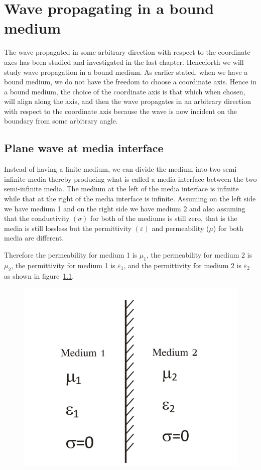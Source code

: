 \chapter{Wave propagating in a bound medium}\label{lec:lec30}
The wave propagated in some arbitrary direction with respect to the coordinate axes has been studied and investigated in the last chapter. Henceforth we will study wave propagation in a bound medium. As earlier stated, when we have a bound medium, we do not have the freedom to choose a coordinate axis. Hence in a bound medium, the choice of the coordinate axis is that which when chosen, will align along the axis, and then the wave propagates in an arbitrary direction with respect to the coordinate axis because the wave is now incident on the boundary from some arbitrary angle.

\section{Plane wave at media interface}

Instead of having a finite medium, we can divide the medium into two semi-infinite media thereby producing what is called a media interface between the two semi-infinite media. The medium at the left of the media interface is infinite while that at the right of the media interface is infinite. Assuming on the left side we have medium 1 and on the right side we have medium 2 and also assuming that the conductivity $(\sigma)$ for both of the mediums is still zero, that is the media is still lossless but the permittivity $(\varepsilon)$ and permeability ($\mu$) for both media are different.

Therefore the permeability for medium 1 is $\mu_1$, the permeability for medium 2 is $\mu_2$, the permittivity for medium 1 is $\varepsilon_1$, and the permittivity for medium 2 is $\varepsilon_2$ as shown in figure~\ref{fig:group30a}.

\begin{figure}[h]
\centering
\includegraphics[width=.7\linewidth]{./graphics/group30a}
\caption{}
\label{fig:group30a}
\end{figure}

